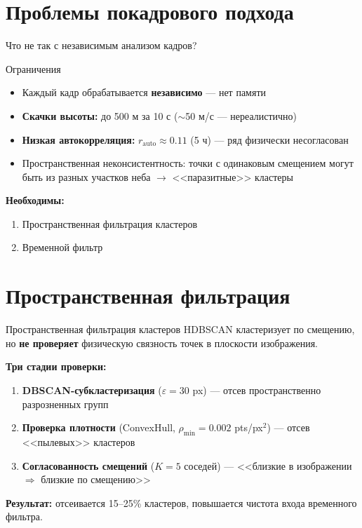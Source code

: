\documentclass[11pt,aspectratio=169]{beamer}
\begin{document}

\section{Проблемы покадрового подхода}

\begin{frame}{Что не так с независимым анализом кадров?}
\begin{alertblock}{Ограничения}
\begin{itemize}
	\item Каждый кадр обрабатывается \textbf{независимо} --- нет памяти
	\item \textbf{Скачки высоты:} до 500 м за 10 с ($\sim$50 м/с --- нереалистично)
	\item \textbf{Низкая автокорреляция:} $r_\text{auto} \approx 0.11$ (5 ч) --- ряд физически несогласован
	\item Пространственная неконсистентность: точки с одинаковым смещением могут быть из разных участков неба $\to$ <<паразитные>> кластеры
\end{itemize}
\end{alertblock}

\vspace{2mm}
\textbf{Необходимы:}
\begin{enumerate}
	\item Пространственная фильтрация кластеров
	\item Временной фильтр
\end{enumerate}
\end{frame}


\section{Пространственная фильтрация}

\begin{frame}{Пространственная фильтрация кластеров}
HDBSCAN кластеризует по смещению, но \textbf{не проверяет} физическую связность точек в плоскости изображения.

\vspace{2mm}
\textbf{Три стадии проверки:}
\begin{enumerate}
	\item \textbf{DBSCAN-субкластеризация} ($\varepsilon = 30$ px) --- отсев пространственно разрозненных групп
	\item \textbf{Проверка плотности} (ConvexHull, $\rho_\text{min} = 0.002$ pts/px$^2$) --- отсев <<пылевых>> кластеров
	\item \textbf{Согласованность смещений} ($K=5$ соседей) --- <<близкие в изображении $\Rightarrow$ близкие по смещению>>
\end{enumerate}

\vspace{2mm}
\textbf{Результат:} отсеивается 15--25\% кластеров, повышается чистота входа временного фильтра.
\end{frame}
\end{document}
